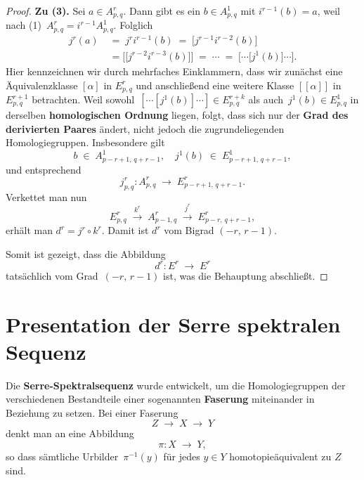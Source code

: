 \documentclass[12pt]{article}
\numberwithin{conj}{section}
\begin{document}
\begin{proof}
        \smallskip
        \noindent
        \textbf{Zu (3).} Sei $a \in A^{r}_{p,q}$. Dann gibt es ein $b \in A^{1}_{p,q}$
        mit $i^{r-1}(b) = a$, weil nach (1)
        $\,A^{r}_{p,q}= i^{r-1} A^{1}_{p,q} $. Folglich
        \begin{align}
            j^{r}(a)  & \;=\; j^{r} i^{r-1}(b)  \;=\; \bigl[j^{r-1} i^{r-2}(b) \bigr]                                           \\
            \nonumber & \;= \bigl[\bigl[j^{r-2} i^{r-3}(b) \bigr]\bigr] \;=\; \cdots \;=\; \bigl[\cdots \bigl[j^{1}(b)\bigr]\cdots\bigr].
        \end{align}
        Hier kennzeichnen wir durch mehrfaches Einklammern, dass wir zunächst eine
        Äquivalenzklasse $[\alpha]$ in $E^{r}_{p,q}$ und anschließend eine weitere
        Klasse $[[\alpha]]$ in $E^{r+1}_{p,q}$ betrachten. Weil sowohl $\,[\cdots [
        j^{1}(b)] \cdots] \in E^{r+k}_{p,q}$ als auch $\,j^{1}(b) \in E^{1}_{p,q}$ in
        derselben \textbf{homologischen Ordnung} liegen, folgt, dass sich nur der
        \textbf{Grad des derivierten Paares} ändert, nicht jedoch die
        zugrundeliegenden Homologiegruppen. Insbesondere gilt
        \[
            b \;\in\; A^{1}_{p-r+1,\,q+r-1}, \quad j^{1}(b) \;\in\; E^{1}_{p-r+1,\,q+r-1}
            ,
        \]
        und entsprechend
        \[
            j^{r}_{p,q}: A^{r}_{p,q}\;\longrightarrow\; E^{r}_{p-r+1,\,q+r-1}.
        \]
        Verkettet man nun
        \[
            E^{r}_{p,q}\;\xrightarrow{k^r}\; A^{r}_{p-1,q}\;\xrightarrow{j^r}\; E^{r}_{p-r,\,q+r-1}
            ,
        \]
        erhält man $d^{r} = j^{r} \circ k^{r}$. Damit ist $d^{r}$ vom Bigrad
        $(-r,\,r-1)$.

        \bigskip

        \noindent
        Somit ist gezeigt, dass die Abbildung
        \[
            d^{r} : E^{r} \;\longrightarrow\; E^{r}
        \]
        tatsächlich vom Grad $\,(-r,\,r-1)$ ist, was die Behauptung abschließt.
    \end{proof}

    \section{Presentation der Serre spektralen Sequenz}
    Die \textbf{Serre-Spektralsequenz} wurde entwickelt, um die Homologiegruppen der
    verschiedenen Bestandteile einer sogenannten \textbf{Faserung} miteinander in
    Beziehung zu setzen. Bei einer Faserung
    \[
        Z \;\longrightarrow\; X \;\longrightarrow\; Y
    \]
    denkt man an eine Abbildung
    \[
        \pi : X \;\longrightarrow\; Y,
    \]
    so dass sämtliche Urbilder $\,\pi^{-1}(y)$ für jedes $y \in Y$ homotopieäquivalent
    zu $Z$ sind.
\end{document}
